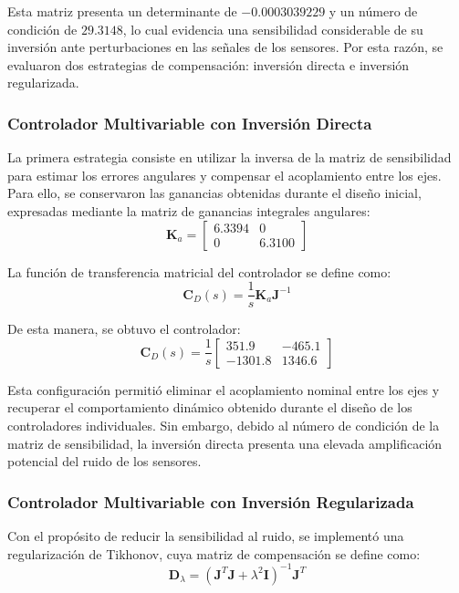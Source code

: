 \documentclass[12pt,a4paper]{article}
\begin{document}
Esta matriz presenta un determinante de $-0.0003039229$ y un número de condición de $29.3148$, lo cual evidencia una sensibilidad considerable de su inversión ante perturbaciones en las señales de los sensores. Por esta razón, se evaluaron dos estrategias de compensación: inversión directa e inversión regularizada.

\subsubsection{Controlador Multivariable con Inversión Directa}
La primera estrategia consiste en utilizar la inversa de la matriz de sensibilidad para estimar los errores angulares y compensar el acoplamiento entre los ejes. Para ello, se conservaron las ganancias obtenidas durante el diseño inicial, expresadas mediante la matriz de ganancias integrales angulares:
\begin{equation}
\mathbf{K}_a = \begin{bmatrix} 6.3394 & 0 \\ 0 & 6.3100 \end{bmatrix}
\end{equation}

La función de transferencia matricial del controlador se define como:
\begin{equation}
\mathbf{C}_D(s) = \frac{1}{s}\mathbf{K}_a\mathbf{J}^{-1}
\end{equation}

De esta manera, se obtuvo el controlador:
\begin{equation}
\boxed{
\mathbf{C}_D(s) = \frac{1}{s}\begin{bmatrix} 351.9 & -465.1 \\ -1301.8 & 1346.6 \end{bmatrix}
}
\end{equation}

Esta configuración permitió eliminar el acoplamiento nominal entre los ejes y recuperar el comportamiento dinámico obtenido durante el diseño de los controladores individuales. Sin embargo, debido al número de condición de la matriz de sensibilidad, la inversión directa presenta una elevada amplificación potencial del ruido de los sensores.

\subsubsection{Controlador Multivariable con Inversión Regularizada}
Con el propósito de reducir la sensibilidad al ruido, se implementó una regularización de Tikhonov, cuya matriz de compensación se define como:
\begin{equation}
\mathbf{D}_\lambda = \left(\mathbf{J}^T\mathbf{J} + \lambda^2\mathbf{I}\right)^{-1}\mathbf{J}^T
\end{equation}
\end{document}
